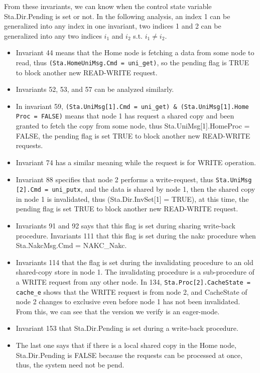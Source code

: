 \documentclass{llncs}
\begin{document}
From these invariants, we can know when the control state variable Sta.Dir.Pending is set or not. In the following analysis, an index 1 can be generalized into any index in one invariant,  two indices 1 and 2 can be generalized into any two indices $i_1$ and $i_2$ s.t. $i_1 \neq i_2$.
\vspace{-0.2cm}
\begin{itemize}
 \item Invariant 44 means that the Home node is fetching a data from some node to read, thus {\tt (Sta.HomeUniMsg.Cmd = uni\_get)}, so the pending flag is  TRUE to block another new READ-WRITE request.
 \item Invariants 52, 53, and 57 can be analyzed similarly.
 \item In invariant 59, {\tt (Sta.UniMsg[1].Cmd = uni\_get) \& (Sta.UniMsg[1].Home} {\tt Proc = FALSE)} means that node 1 has request a shared copy and been granted to fetch the copy from some node, thus Sta.UniMsg[1].HomeProc = FALSE, the pending flag is set TRUE to block another new READ-WRITE requests.
  \item    Invariant 74 has a similar meaning while the request is for WRITE operation.

  \item    Invariant 88 specifies that node 2 performs a write-request, thus {\tt Sta.UniMsg} {\tt[2].Cmd = uni\_putx}, and the data is shared by node 1, then the shared copy in node 1 is invalidated, thus (Sta.Dir.InvSet[1] = TRUE), at this time,  the pending flag is set TRUE to block another new READ-WRITE request.

  \item   Invariants 91 and 92 says that this flag is set during sharing write-back procedure. Invariants 111  that this flag is set during the nakc procedure when  Sta.NakcMsg.Cmd = NAKC\_Nakc.

   \item     Invariants 114 that the flag is set during the invalidating procedure to an old shared-copy store in node 1. The invalidating procedure is a sub-procedure  of a WRITE request from any other node. In 134, {\tt Sta.Proc[2].CacheState = cache\_e} shows that the WRITE request is from node 2, and CacheState of node 2 changes to exclusive even before node 1 has not been invalidated. From this, we can see that the version we verify is an eager-mode.

   \item       Invariant 153 that Sta.Dir.Pending is set during a write-back procedure.

  \item  The last one says that if there is a  local shared copy in the Home node, Sta.Dir.Pending is FALSE because the   requests can be processed at once, thus, the system need not be pend.
\end{itemize}
\end{document}
